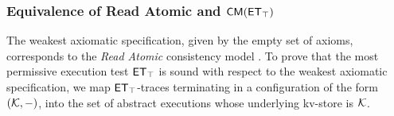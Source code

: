 
\subsubsection{Equivalence of Read Atomic and \(\CMs(\ET_{\top})\)} 
The weakest axiomatic specification, given by the empty set of 
axioms, corresponds to the \emph{Read Atomic} consistency model \cite{ramp}. 
To prove that the most permissive execution test \(\mathsf{ET}_{\top}\) is sound with 
respect to the weakest axiomatic specification, we map \(\mathsf{ET}_{\top}\)-traces 
terminating in a configuration of the form \((\mathcal{K}, -)\), into the set of 
abstract executions whose underlying kv-store is \(\mathcal{K}\). 


